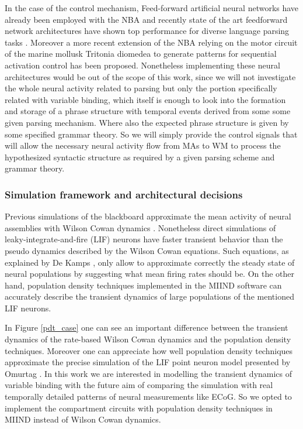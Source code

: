 \documentclass[10pt]{article}
\begin{document}
In the case of the control mechanism, Feed-forward artificial neural
networks have already been employed with the NBA \cite{van_der_Velde_2010} and
recently state of the art feedforward network architectures have shown
top performance for diverse language parsing tasks \cite{Andor_2016}.
Moreover a more recent extension of the NBA relying on the motor circuit
of the marine mollusk Tritonia diomedea to generate patterns for
sequential activation control has been proposed\cite{van_Dijk_2015}.
Nonetheless implementing these neural architectures would be out of the
scope of this work, since we will not investigate the whole neural
activity related to parsing but only the portion specifically related
with variable binding, which itself is enough to look into the formation
and storage of a phrase structure with temporal events derived from some
some given parsing mechanism. Where also the expected phrase structure
is given by some specified grammar theory. So we will simply provide the
control signals that will allow the necessary neural activity flow from
MAs to WM to process the hypothesized syntactic structure as required by
a given parsing scheme and grammar theory.

\subsubsection{Simulation framework and architectural
decisions}\label{simulation-framework-and-architectural-decisions}

Previous simulations of the blackboard approximate the mean activity of
neural assemblies with Wilson Cowan dynamics \cite{Frank_2014}.
Nonetheless direct simulations of leaky-integrate-and-fire (LIF) neurons
\cite{omurtag2000simulation} have faster transient behavior than the pseudo
dynamics described by the Wilson Cowan equations. Such equations, as
explained by De Kamps \cite{de_Kamps_2008}, only allow to approximate
correctly the steady state of neural populations by suggesting what mean
firing rates should be. On the other hand, population density techniques
\cite{de2013generic} implemented in the MIIND software \cite{de_Kamps_2008}
\cite{harrison2011new} can accurately describe the transient dynamics of
large populations of the mentioned LIF neurons.

In Figure \ref{pdt_case} one can see an important difference between the
transient dynamics of the rate-based Wilson Cowan dynamics and the
population density techniques. Moreover one can appreciate how well
population density techniques approximate the precise simulation of the
LIF point neuron model presented by Omurtag \cite{omurtag2000simulation}. In this
work we are interested in modelling the transient dynamics of variable
binding with the future aim of comparing the simulation with real
temporally detailed patterns of neural measurements like ECoG. So we
opted to implement the compartment circuits with population density
techniques in MIIND instead of Wilson Cowan dynamics.
\end{document}
